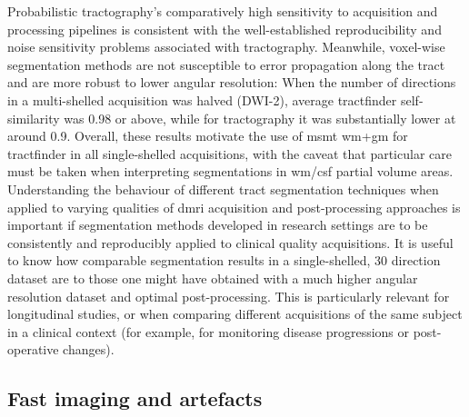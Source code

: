 \documentclass[12pt,phd,a4paper,twoside]{ucl_thesis}
\begin{document}
Probabilistic tractography's comparatively high sensitivity to acquisition and processing pipelines is consistent with the well-established reproducibility and noise sensitivity problems associated with tractography.
Meanwhile, voxel-wise segmentation methods are not susceptible to error propagation along the tract and are more robust to lower angular resolution:
When the number of directions in a multi-shelled acquisition was halved (DWI-2), average tractfinder self-similarity was 0.98 or above, while for tractography it was substantially lower at around 0.9.
Overall, these results motivate the use of \gls{msmt} \gls{wm}+\gls{gm} for tractfinder in all single-shelled acquisitions, with the caveat that particular care must be taken when interpreting segmentations in \gls{wm}/\gls{csf} partial volume areas.
Understanding the behaviour of different tract segmentation techniques when applied to varying qualities of \gls{dmri} acquisition and post-processing approaches is important if segmentation methods developed in research settings are to be consistently and reproducibly applied to clinical quality acquisitions.
It is useful to know how comparable segmentation results in a single-shelled, 30 direction dataset are to those one might have obtained with a much higher angular resolution dataset and optimal post-processing.
This is particularly relevant for longitudinal studies, or when comparing different acquisitions of the same subject in a clinical context (for example, for monitoring disease progressions or post-operative changes).

\subsection{Fast imaging and artefacts}
\end{document}

